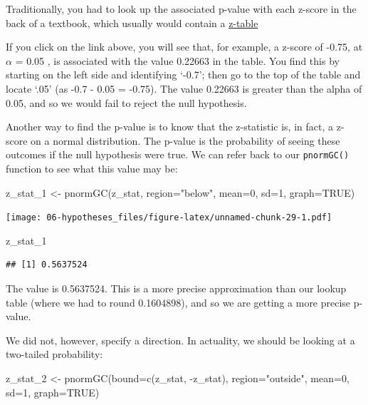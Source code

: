 \documentclass[
]{book}
\newenvironment{Shaded}{\begin{snugshade}}{\end{snugshade}}
\newcommand{\AttributeTok}[1]{\textcolor[rgb]{0.77,0.63,0.00}{#1}}
\newcommand{\ConstantTok}[1]{\textcolor[rgb]{0.00,0.00,0.00}{#1}}
\newcommand{\DecValTok}[1]{\textcolor[rgb]{0.00,0.00,0.81}{#1}}
\newcommand{\FunctionTok}[1]{\textcolor[rgb]{0.00,0.00,0.00}{#1}}
\newcommand{\NormalTok}[1]{#1}
\newcommand{\OtherTok}[1]{\textcolor[rgb]{0.56,0.35,0.01}{#1}}
\newcommand{\SpecialCharTok}[1]{\textcolor[rgb]{0.00,0.00,0.00}{#1}}
\newcommand{\StringTok}[1]{\textcolor[rgb]{0.31,0.60,0.02}{#1}}
\begin{document}
Traditionally, you had to look up the associated p-value with each z-score in the back of a textbook, which usually would contain a \href{https://www.math.arizona.edu/~rsims/ma464/standardnormaltable.pdf}{z-table}

If you click on the link above, you will see that, for example, a z-score of -0.75, at \(\alpha\) = 0.05 , is associated with the value 0.22663 in the table. You find this by starting on the left side and identifying `-0.7'; then go to the top of the table and locate `.05' (as -0.7 - 0.05 = -0.75). The value 0.22663 is greater than the alpha of 0.05, and so we would fail to reject the null hypothesis.

Another way to find the p-value is to know that the z-statistic is, in fact, a z-score on a normal distribution. The p-value is the probability of seeing these outcomes if the null hypothesis were true. We can refer back to our \texttt{pnormGC()} function to see what this value may be:

\begin{Shaded}
\begin{Highlighting}[]
\NormalTok{z\_stat\_1 }\OtherTok{\textless{}{-}} \FunctionTok{pnormGC}\NormalTok{(z\_stat, }\AttributeTok{region=}\StringTok{"below"}\NormalTok{, }\AttributeTok{mean=}\DecValTok{0}\NormalTok{, }\AttributeTok{sd=}\DecValTok{1}\NormalTok{, }\AttributeTok{graph=}\ConstantTok{TRUE}\NormalTok{) }
\end{Highlighting}
\end{Shaded}

\texttt{[image: 06-hypotheses\_files/figure-latex/unnamed-chunk-29-1.pdf]}

\begin{Shaded}
\begin{Highlighting}[]
\NormalTok{z\_stat\_1}
\end{Highlighting}
\end{Shaded}

\begin{verbatim}
## [1] 0.5637524
\end{verbatim}

The value is 0.5637524. This is a more precise approximation than our lookup table (where we had to round 0.1604898), and so we are getting a more precise p-value.

We did not, however, specify a direction. In actuality, we should be looking at a two-tailed probability:

\begin{Shaded}
\begin{Highlighting}[]
\NormalTok{z\_stat\_2 }\OtherTok{\textless{}{-}} \FunctionTok{pnormGC}\NormalTok{(}\AttributeTok{bound=}\FunctionTok{c}\NormalTok{(z\_stat, }\SpecialCharTok{{-}}\NormalTok{z\_stat), }\AttributeTok{region=}\StringTok{"outside"}\NormalTok{, }\AttributeTok{mean=}\DecValTok{0}\NormalTok{, }\AttributeTok{sd=}\DecValTok{1}\NormalTok{, }\AttributeTok{graph=}\ConstantTok{TRUE}\NormalTok{) }
\end{Highlighting}
\end{Shaded}
\end{document}
